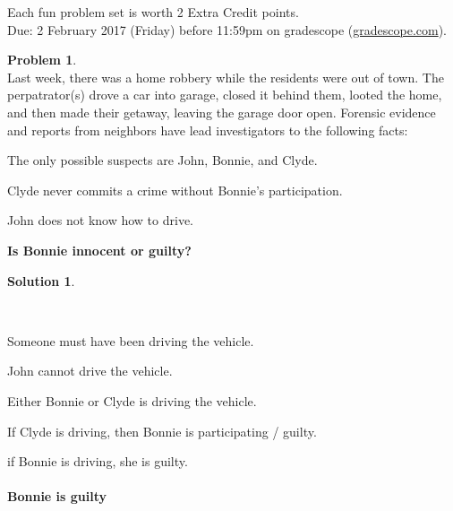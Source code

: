\documentclass{article}
\theoremstyle{definition}
\newtheorem{problem}{Problem}
\newtheorem*{solution}{Solution}
\begin{document}
\noindent
Each fun problem set is worth 2 Extra Credit points.\\
Due: 2 February 2017 (Friday) before 11:59pm on gradescope (\url{gradescope.com}).\\

\noindent
\begin{problem}\ \\
Last week, there was a home robbery while the residents were out of town.  The perpatrator(s) drove a car into garage, closed it behind them, looted the home, and then made their getaway, leaving the garage door open.  Forensic evidence and reports from neighbors have lead investigators to the following facts:
\begin{compactenum}
\item The only possible suspects are John, Bonnie, and Clyde.
\item Clyde never commits a crime without Bonnie's participation.
\item John does not know how to drive.
\end{compactenum}
\textbf{Is Bonnie innocent or guilty?}
\end{problem}

\begin{solution}
\begin{compactenum} \ \\


\item Someone must have been driving the vehicle. 
\item John cannot drive the vehicle. 
\item Either Bonnie or Clyde is driving the vehicle.
\item If Clyde is driving, then Bonnie is participating / guilty.
\item if Bonnie is driving, she is guilty.
\ \\
\\
\textbf{Bonnie is guilty}

\end{compactenum}
\end{solution}
 
\newpage
\end{document}
